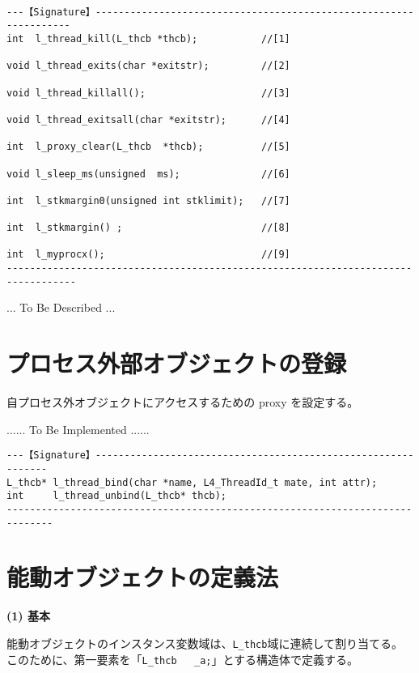 \begin{verbatim}

---【Signature】------------------------------------------------------------------
int  l_thread_kill(L_thcb *thcb);           //[1]

void l_thread_exits(char *exitstr);         //[2]

void l_thread_killall();                    //[3]

void l_thread_exitsall(char *exitstr);      //[4]

int  l_proxy_clear(L_thcb  *thcb);          //[5]

void l_sleep_ms(unsigned  ms);              //[6]

int  l_stkmargin0(unsigned int stklimit);   //[7]

int  l_stkmargin() ;                        //[8]

int  l_myprocx();                           //[9]
----------------------------------------------------------------------------------
\end{verbatim}


... To Be Described ...



\section{ プロセス外部オブジェクトの登録}

自プロセス外オブジェクトにアクセスするための proxy を設定する。

...... To Be Implemented  ......


\begin{verbatim}
---【Signature】--------------------------------------------------------------
L_thcb* l_thread_bind(char *name, L4_ThreadId_t mate, int attr);
int     l_thread_unbind(L_thcb* thcb);
------------------------------------------------------------------------------

\end{verbatim}

\hspace{4cm}


\section{能動オブジェクトの定義法}

{\flushleft\bf (1) 基本}

能動オブジェクトのインスタンス変数域は、\verb|L_thcb|域に連続して割り当てる。
このために、第一要素を「\verb|L_thcb   _a;|」とする構造体で定義する。

